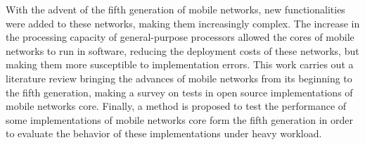 With the advent of the fifth generation of mobile networks, new functionalities were added to these networks, making them increasingly complex.
The increase in the processing capacity of general-purpose processors allowed the cores of mobile networks to run in software, reducing the deployment costs of these networks, but making them more susceptible to implementation errors.
This work carries out a literature review bringing the advances of mobile networks from its beginning to the fifth generation, making a survey on tests in open source implementations of mobile networks core.
Finally, a method is proposed to test the performance of some implementations of mobile networks core form the fifth generation in order to evaluate the behavior of these implementations under heavy workload.